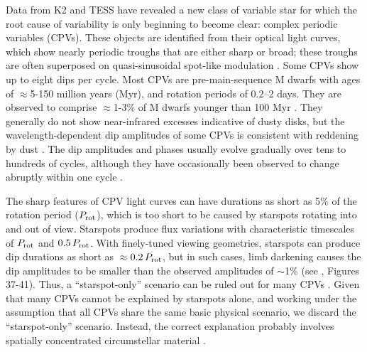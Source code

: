 \documentclass[11pt,twocolumn,tighten]{aastex63}
\begin{document}
Data from K2 \citep{2014PASP..126..398H} and TESS
\citep{2015JATIS...1a4003R} have revealed a new class of variable star
for which the root cause of variability is only beginning to become
clear: complex periodic variables (CPVs).  These objects are
identified from their optical light curves, which show nearly periodic
troughs that are either sharp or broad; these troughs are often
superposed on quasi-sinusoidal spot-like modulation
\citep{2017AJ....153..152S,2018AJ....155...63S,2019ApJ...876..127Z}.
Some CPVs show up to eight dips per cycle.  Most CPVs are
pre-main-sequence M dwarfs with ages of $\approx$5-150 million years
(Myr), and rotation periods of 0.2--2 days.  They are observed to
comprise $\approx$1-3\% of M dwarfs younger than 100 Myr
\citep{2016AJ....152..114R,2022AJ....163..144G}.  They generally do
not show near-infrared excesses indicative of dusty disks, but the
wavelength-dependent dip amplitudes of some CPVs is consistent with
reddening by dust
\citep{2017PASJ...69L...2O,2020AJ....160...86B,2022AJ....163..144G,2023MNRAS.518.2921K}.
The dip amplitudes and phases usually evolve gradually over tens to
hundreds of cycles, although they have occasionally been observed to
change abruptly within one cycle
\citep[e.g.][]{2017AJ....153..152S,2022ApJ...925...75P,2023ApJ...945..114P}.

The sharp features of CPV light curves can have durations as short as
5\% of the rotation period ($P_{\rm rot}$), which is too short to be
caused by starspots rotating into and out of view.  Starspots produce
flux variations with characteristic timescales of $P_{\rm rot}$ and
$0.5\,P_{\rm rot}$.  With finely-tuned viewing geometries, starspots
can produce dip durations as short as $\approx$$0.2\,P_{\rm rot}$, but
in such cases, limb darkening causes the dip amplitudes to be smaller
than the observed amplitudes of $\sim$1\% (see
\citealt{2017AJ....153..152S}, Figures 37-41).  Thus, a
``starspot-only'' scenario can be ruled out for many CPVs
\citep{2017AJ....153..152S,2019ApJ...876..127Z,2021MNRAS.500.1366K}.
Given that many CPVs cannot be explained by starspots alone, and
working under the assumption that all CPVs share the same basic
physical scenario, we discard the ``starspot-only'' scenario.
Instead, the correct explanation probably involves spatially
concentrated circumstellar material
\citep[e.g.][]{2017AJ....153..152S,2022AJ....163..144G}.
\end{document}
